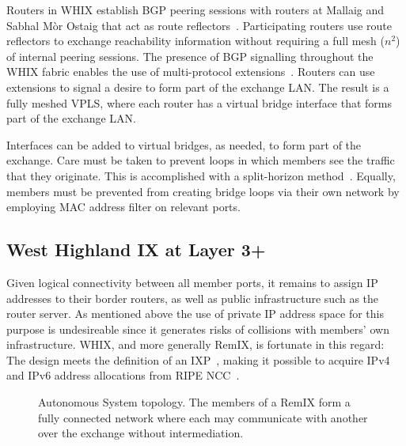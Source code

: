 Routers in \ac{WHIX} establish \acs{BGP} peering sessions with routers at
Mallaig and Sabhal M\`{o}r Ostaig that act as route reflectors~\cite{rfc4456}.
Participating routers use route reflectors to exchange reachability information
without requiring a full mesh ($n^2$) of internal peering sessions. The presence
of \acs{BGP} signalling throughout the \ac{WHIX} fabric enables the use of
multi-protocol extensions~\cite{rfc4760}. Routers can use extensions to signal a
desire to form part of the exchange \acs{LAN}.
The result is a fully meshed \acs{VPLS}, where each router has a virtual bridge
interface that forms part of the exchange \acs{LAN}.

Interfaces can be added to virtual bridges, as needed, to
form part of the exchange. Care must be taken to prevent loops in which members
see the traffic that they originate. This is accomplished with a split-horizon
method~\cite{rfc4762}. Equally, members must be prevented from creating bridge
loops via their own network by employing \acs{MAC} address filter on relevant
ports.

\subsection{West Highland IX at Layer 3+}

Given logical connectivity between all member ports, it remains to assign IP
addresses to their border routers, as well as public infrastructure such as the
router server. As mentioned above the use of private IP address space for this
purpose is undesireable since it generates risks of collisions with members' own
infrastructure. \ac{WHIX}, and more generally RemIX, is fortunate in this
regard: The design meets the definition of an \ac{IXP}~\cite{ripe451,whixrules},
making it possible to acquire IPv4 and IPv6 address allocations from RIPE
NCC~\cite{ripe649}.

\begin{figure}[h]
  \resizebox{0.8\linewidth}{!}{
    \begin{tikzpicture}
      \whixtopodiagram
    \end{tikzpicture}
  }
  \caption{
  Autonomous System topology. The members of a RemIX form a fully
  connected network where each may communicate with another over the
  exchange without intermediation.
  }
  \label{fig:l3}
\end{figure}

